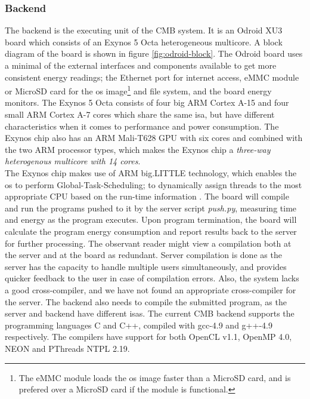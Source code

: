 \subsubsection{Backend} The backend is the executing unit of the CMB system. It is an Odroid XU3 board \cite{XU3} which consists of an Exynos 5 Octa heterogeneous multicore. A block diagram of the board is shown in figure \ref{fig:odroid-block}.  The Odroid board uses a minimal of the external interfaces and components available to get more consistent energy readings; the Ethernet port for internet access, eMMC module or MicroSD card for the \gls{os} image\footnote{The eMMC module loads the \gls{os} image faster than a MicroSD card, and is prefered over a MicroSD card if the module is functional.} and file system, and the board energy monitors. The Exynos 5 Octa consists of four big ARM Cortex A-15 and four small ARM Cortex A-7 cores which share the same \gls{isa}, but have different characteristics when it comes to performance and power consumption. The Exynos chip also has an ARM Mali-T628 GPU with six cores and combined with the two ARM processor types, which makes the Exynos chip a \textit{three-way heterogenous multicore with 14 cores}. \\

The Exynos chip makes use of ARM big.LITTLE technology, which enables the \gls{os} to perform Global-Task-Scheduling; to dynamically assign threads to the most appropriate CPU based on the run-time information \cite{ABL}. The board will compile and run the programs pushed to it by the server script \textit{push.py}, measuring time and energy as the program executes. Upon program termination, the board will calculate the program energy consumption and report results back to the server for further processing. The observant reader might view a compilation both at the server and at the board as redundant. Server compilation is done as the server has the capacity to handle multiple users simultaneously, and provides quicker feedback to the user in case of compilation errors. Also, the system lacks a good cross-compiler, and we have not found an appropriate cross-compiler for the server. The backend also needs to compile the submitted program, as the server and backend have different \gls{isa}s. The current CMB backend supports the programming languages C and C++, compiled with gcc-4.9 and g++-4.9 respectively. The compilers have support for both OpenCL v1.1, OpenMP 4.0, NEON and PThreads NTPL 2.19.


